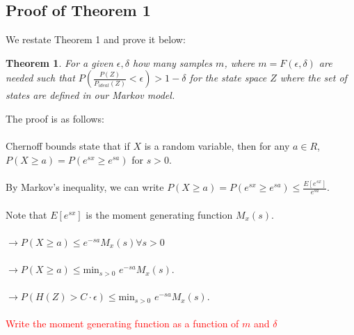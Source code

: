 \documentclass[letterpaper,twocolumn,10pt]{article}
\newtheorem{theorem}{Theorem}
\begin{document}
\subsection{Proof of Theorem 1}
We restate Theorem 1 and prove it below:

\begin{theorem}
\label{mainThm}
For a given $\epsilon, \delta$ how many samples $m$, where $m = F(\epsilon, \delta)$ are needed such that $P(\frac{P(Z)}{P_{ideal}(Z)}< \epsilon) > 1 - \delta$ for the state space $Z$ where the set of states are defined in our Markov model. 
\end{theorem}

The proof is as follows:
\\
\\
Chernoff bounds state that if $X$ is a random variable, then for any $a \in R$, $P(X \geq a) = P(e^{sx} \geq e^{sa})$ for $s > 0$. 
\\
\\
By Markov's inequality, we can write $P(X \geq a)  = P(e^{sx} \geq e^{sa}) \leq \frac{E[e^{sx}]}{e^{sa}}$. 
\\
\\
Note that $E[e^{sx}]$ is the moment generating function $M_{x}(s)$. 
\\
\\
$\rightarrow P(X \geq a) \leq e^{-sa} M_{x}(s) \forall s > 0$
\\
\\
$\rightarrow P(X \geq a) \leq $min$_{s >0}$ $e^{-sa} M_{x}(s)$.
\\
\\
$\rightarrow P(H(Z) > C \cdot \epsilon) \leq $min$_{s >0}$ $e^{-sa} M_{x}(s)$.
\\
\\
\textcolor{red}{Write the moment generating function as a function of $m$ and $\delta$}




\end{document}
